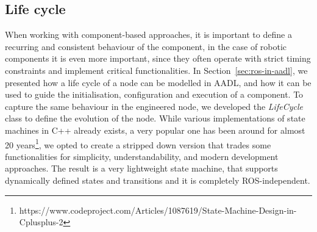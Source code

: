 \subsection{Life cycle}
When working with component-based approaches, it is important to define a recurring and consistent behaviour of the component, in the case of robotic components it is even more important, since they often operate with strict timing constraints and implement critical functionalities. In Section~\ref{sec:ros-in-aadl}, we presented how a life cycle of a node can be modelled in AADL, and how it can be used to guide the initialisation, configuration and execution of a component. To capture the same behaviour in the engineered node, we developed the \textit{LifeCycle} class to define the evolution of the node. While various implementations of state machines in C++ already exists, a very popular one has been around for almost 20 years\footnote{https://www.codeproject.com/Articles/1087619/State-Machine-Design-in-Cplusplus-2}, we opted to create a stripped down version that trades some functionalities for simplicity, understandability, and modern development approaches. The result is a very lightweight state machine, that supports dynamically defined states and transitions and it is completely ROS-independent.

